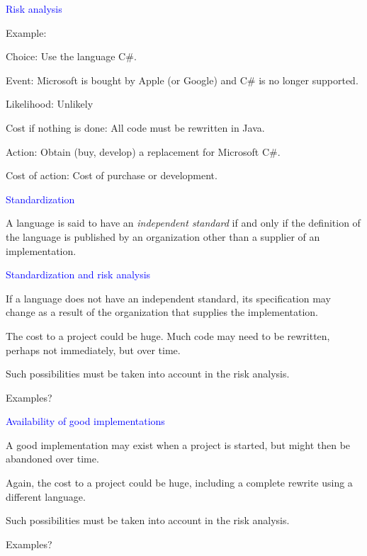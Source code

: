 \documentclass{slides}
\newcommand{\ti}[1]{\begin{center}\Large{\textcolor{blue}{#1}}\end{center}}
\begin{document}
\begin{slide}\ti{Risk analysis}

Example:

Choice: Use the language C\#.

Event: Microsoft is bought by Apple (or Google) and C\# is no longer
supported.

Likelihood: Unlikely

Cost if nothing is done: All code must be rewritten in Java.

Action: Obtain (buy, develop) a replacement for Microsoft C\#.

Cost of action: Cost of purchase or development.

\vfill\end{slide}
\begin{slide}\ti{Standardization}

A language is said to have an \emph{independent standard} if and only
if the definition of the language is published by an organization
other than a supplier of an implementation.

\vfill\end{slide}
\begin{slide}\ti{Standardization and risk analysis}

If a language does not have an independent standard, its specification
may change as a result of the organization that supplies the
implementation.

The cost to a project could be huge.  Much code may need to be
rewritten, perhaps not immediately, but over time.

Such possibilities must be taken into account in the risk analysis.

Examples?

\vfill\end{slide}
\begin{slide}\ti{Availability of good implementations}

A good implementation may exist when a project is started, but might
then be abandoned over time.

Again, the cost to a project could be huge, including a complete
rewrite using a different language.

Such possibilities must be taken into account in the risk analysis.

Examples?

\vfill\end{slide}



\end{document}
